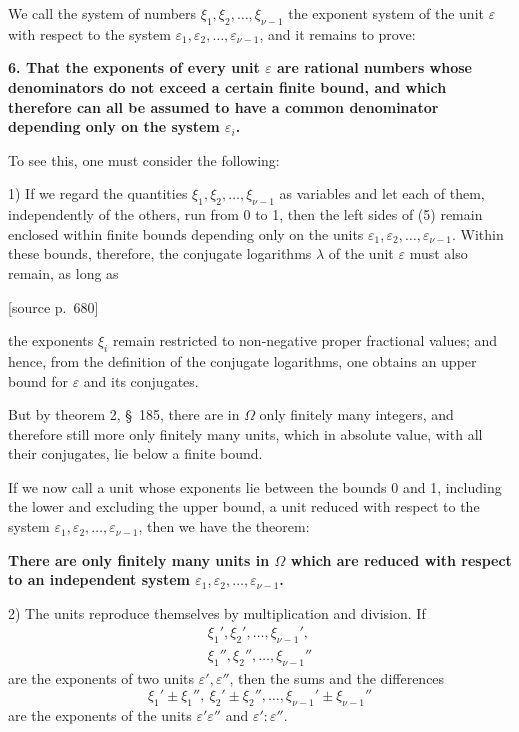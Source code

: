 \documentclass[11pt]{article}
\newcommand{\srcpage}[1]{\par\medskip\noindent\textsf{[source p.~#1]}\par\smallskip}
\begin{document}
We call the system of numbers $\xi_1,\xi_2,\ldots,\xi_{\nu-1}$ the exponent system of the unit $\varepsilon$ with respect to the system $\varepsilon_1,\varepsilon_2,\ldots,\varepsilon_{\nu-1}$, and it remains to prove:

\textbf{6. That the exponents of every unit $\varepsilon$ are rational numbers whose denominators do not exceed a certain finite bound, and which therefore can all be assumed to have a common denominator depending only on the system $\varepsilon_i$.}

To see this, one must consider the following:

1) If we regard the quantities $\xi_1,\xi_2,\ldots,\xi_{\nu-1}$ as variables and let each of them, independently of the others, run from 0 to 1, then the left sides of (5) remain enclosed within finite bounds depending only on the units $\varepsilon_1,\varepsilon_2,\ldots,\varepsilon_{\nu-1}$. Within these bounds, therefore, the conjugate logarithms $\lambda$ of the unit $\varepsilon$ must also remain, as long as
\srcpage{680}
the exponents $\xi_i$ remain restricted to non-negative proper fractional values; and hence, from the definition of the conjugate logarithms, one obtains an upper bound for $\varepsilon$ and its conjugates.

But by theorem 2, \S~185, there are in $\Omega$ only finitely many integers, and therefore still more only finitely many units, which in absolute value, with all their conjugates, lie below a finite bound.

If we now call a unit whose exponents lie between the bounds 0 and 1, including the lower and excluding the upper bound, a unit reduced with respect to the system $\varepsilon_1,\varepsilon_2,\ldots,\varepsilon_{\nu-1}$, then we have the theorem:

\textbf{There are only finitely many units in $\Omega$ which are reduced with respect to an independent system $\varepsilon_1,\varepsilon_2,\ldots,\varepsilon_{\nu-1}$.}

2) The units reproduce themselves by multiplication and division. If
\[
\begin{array}{c}
\xi_1',\xi_2',\ldots,\xi_{\nu-1}',\\
\xi_1'',\xi_2'',\ldots,\xi_{\nu-1}''
\end{array}
\]
are the exponents of two units $\varepsilon',\varepsilon''$, then the sums and the differences
\[
\xi_1'\pm\xi_1'',\ \xi_2'\pm\xi_2'',\ldots,\xi_{\nu-1}'\pm\xi_{\nu-1}''
\]
are the exponents of the units $\varepsilon'\varepsilon''$ and $\varepsilon':\varepsilon''$.
\end{document}

